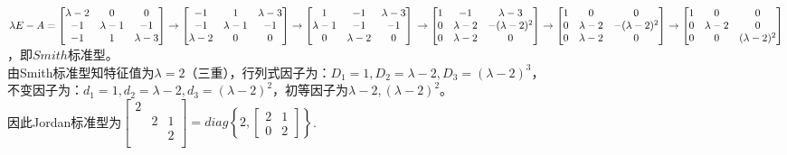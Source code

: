 \documentclass[11pt, a4paper]{article}
\begin{document}
$\lambda E - A=\begin{bmatrix} \lambda-2 & 0 & 0 \\ -1 & \lambda-1 & -1 \\ -1 & 1 & \lambda-3 \end{bmatrix}
\rightarrow
\begin{bmatrix} -1 & 1 & \lambda-3\\-1 & \lambda-1 & -1  \\ \lambda-2 & 0 & 0  \end{bmatrix}
\rightarrow
\begin{bmatrix} 1 & -1 & \lambda-3\\\lambda-1 & -1 & -1  \\  0&\lambda-2  & 0  \end{bmatrix}\\
\rightarrow
\begin{bmatrix} 1 & -1 & \lambda-3\\0 & \lambda-2 & -(\lambda-2)^2   \\  0&\lambda-2  & 0  \end{bmatrix}
\rightarrow
\begin{bmatrix} 1 & 0 & 0\\0 & \lambda-2 & -(\lambda-2)^2   \\  0&\lambda-2  & 0  \end{bmatrix}
\rightarrow
\begin{bmatrix} 1 & 0 & 0\\0 & \lambda-2 & 0 \\  0&0  & (\lambda-2)^2  \end{bmatrix}$，即$Smith$标准型。\\

由Smith标准型知特征值为$\lambda=2$（三重），行列式因子为：$D_1 = 1, D_2= \lambda-2, D_3 = (\lambda-2)^3$，\\不变因子为：$d_1 = 1, d_2= \lambda-2, d_3 = (\lambda-2)^2$，初等因子为$\lambda-2, (\lambda-2)^2$。\\

因此Jordan标准型为$\begin{bmatrix}
2&   &  \\
 & 2 & 1\\
 &   & 2\\
\end{bmatrix}= diag\left\{2, \begin{bmatrix}2 & 1\\ 0& 2\end{bmatrix} \right\}$.\\
\end{document}
